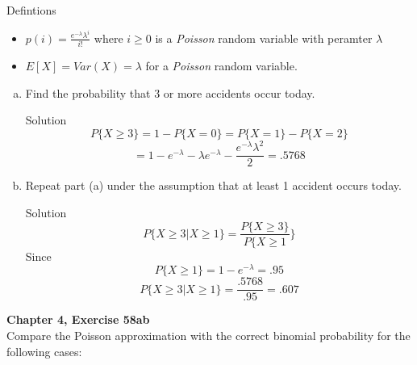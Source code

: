 \documentclass{article}
\begin{document}
\begin{spacing}{1.1}
\begin{homeworkProblem}
  \begin{homeworkSection}{Defintions}
    \begin{itemize}
      \item $p( i) = \frac{ e^{-\lambda} \lambda^i}{ i!}$ where 
        $i \ge 0$ is a \emph{Poisson} random variable with peramter $\lambda$ 
      \item $E[ X] = Var( X) = \lambda$ for a \emph{Poisson} random variable.
    \end{itemize}
  \end{homeworkSection}
  \begin{enumerate}[(a)]
    \item Find the probability that 3 or more accidents occur today.
      \begin{homeworkSection}{Solution}
        \[P\{ X \ge 3 \} = 1 - P\{ X = 0\} = P\{ X = 1\} - P\{ X = 2\}\]
        \[= 1 - e^{-\lambda} - \lambda e^{-\lambda} - \frac{ e^{-\lambda} \lambda^2}{ 2} = .5768\]
      \end{homeworkSection}
    \item Repeat part (a) under the assumption that at least 1 accident 
      occurs today.
      \begin{homeworkSection}{Solution}
        \[P\{ X \ge 3 | X \ge 1\} = \frac{ P\{ X \ge 3\}}{ P\{ X \ge 1}\}\]
        Since
        \[P\{X \ge 1\} = 1 - e^{-\lambda} = .95\]
        \[P\{ X \ge 3 | X \ge 1\} = \frac{ .5768}{ .95} = .607\]
      \end{homeworkSection}
  \end{enumerate}
\end{homeworkProblem}

\newpage
\begin{homeworkProblem}
  {\bf Chapter 4, Exercise 58ab}\\
  Compare the Poisson approximation with the correct binomial probability 
  for the following cases:
 

\end{homeworkProblem}
\end{spacing}
\end{document}
